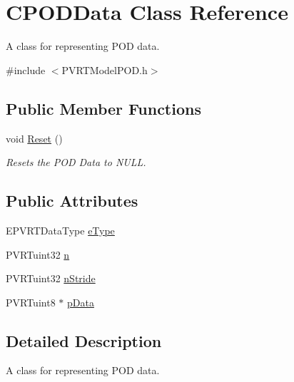 \hypertarget{class_c_p_o_d_data}{\section{C\+P\+O\+D\+Data Class Reference}
\label{class_c_p_o_d_data}
}


A class for representing P\+O\+D data.  




{\ttfamily \#include $<$P\+V\+R\+T\+Model\+P\+O\+D.\+h$>$}

\subsection*{Public Member Functions}
\begin{DoxyCompactItemize}
\item 
void \hyperlink{class_c_p_o_d_data_a6c98d68031a2f94daa59cc3101ab8219}{Reset} ()
\begin{DoxyCompactList}\small\item\em Resets the P\+O\+D Data to N\+U\+L\+L. \end{DoxyCompactList}\end{DoxyCompactItemize}
\subsection*{Public Attributes}
\begin{DoxyCompactItemize}
\item 
E\+P\+V\+R\+T\+Data\+Type \hyperlink{class_c_p_o_d_data_aadf7a49b185833b74d8363dd18ffbae5}{e\+Type}
\item 
P\+V\+R\+Tuint32 \hyperlink{class_c_p_o_d_data_a4102d7abbc069d774442f6aa961b4c54}{n}
\item 
P\+V\+R\+Tuint32 \hyperlink{class_c_p_o_d_data_afabb6ae34ec70b41b60a263ec2d121b6}{n\+Stride}
\item 
P\+V\+R\+Tuint8 $\ast$ \hyperlink{class_c_p_o_d_data_a82a019e63f8b970beff5a1f2ba72322c}{p\+Data}
\end{DoxyCompactItemize}


\subsection{Detailed Description}
A class for representing P\+O\+D data. 



 

